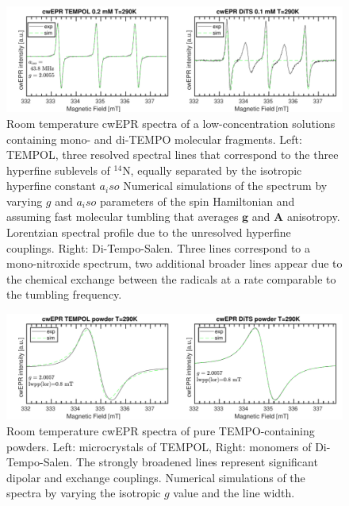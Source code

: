 \begin{figure}[h]
\center
	\includegraphics[width=1\textwidth]{./operando_epr/figures/TEMPOL/cwEPR_TEMPOL_vs_DiTS_RT.pdf}
	\caption{Room temperature cwEPR spectra of a low-concentration solutions containing mono- and di-TEMPO molecular fragments. Left: TEMPOL, three resolved spectral lines that correspond to the three hyperfine sublevels of $^{14}$N, equally separated by the isotropic hyperfine constant $a_iso$ Numerical simulations of the spectrum by varying $g$ and $a_iso$ parameters of the spin Hamiltonian and assuming fast molecular tumbling that averages $\textbf{g}$ and $\textbf{A}$ anisotropy. Lorentzian spectral profile due to the unresolved hyperfine couplings. Right: Di-Tempo-Salen. Three lines correspond to a mono-nitroxide spectrum, two additional broader lines appear due to the chemical exchange between the radicals at a rate comparable to the tumbling frequency.}
	\label{fig:cwEPR_monoTEMPO_diTEMPO_SOLUTION}
\end{figure}
\begin{figure}[h]
\center
	\includegraphics[width=1\textwidth]{./operando_epr/figures/TEMPOL/cwEPR_TEMPOL_vs_DiTS_RT_POWDER.pdf}
	\caption{Room temperature cwEPR spectra of pure TEMPO-containing powders. Left: microcrystals of TEMPOL, Right: monomers of Di-Tempo-Salen. The strongly broadened lines represent significant dipolar and exchange couplings. Numerical simulations of the spectra by varying the isotropic $g$ value and the line width.}
	\label{fig:cwEPR_monoTEMPO_diTEMPO_POWDER}
\end{figure}


